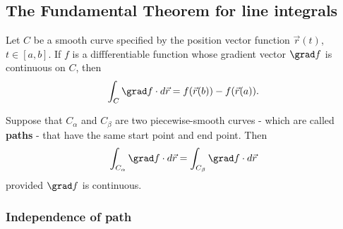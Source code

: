 \documentclass{article}
\begin{document}
\subsection{The Fundamental Theorem for line integrals}


\begin{theorem}
	Let $C$ be a smooth curve specified by the position vector function
	$\vec r(t)$, $t\in[a,b]$. If $f$ is a diffferentiable function
	whose gradient vector $\grad f$ is continuous on $C$, then
	\begin{align*}
		\int_C \grad f\cdot d\vec r = f(\vec r(b)) - f(\vec r(a)).
	\end{align*}
\end{theorem}
\begin{lemma}
	Suppose that $C_\alpha$ and $C_\beta$ are two piecewise-smooth curves
	- which are called \textbf{paths} - that have the same start point and end
	point. Then
	\begin{align*}
		\int_{C_\alpha} \grad f \cdot d\vec r = \int_{C_\beta} \grad f \cdot d\vec r
	\end{align*}
	provided $\grad f$ is continuous.
\end{lemma}

\subsubsection{Independence of path}
\end{document}
